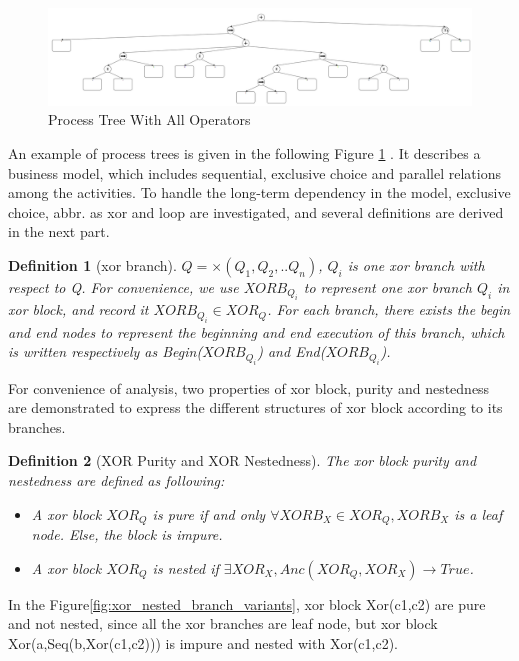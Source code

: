 \documentclass[]{article}
\newtheorem{mydef}{Definition}[section]
\begin{document}
\begin{figure}[h!]
	\includegraphics[width=\textwidth]{PT01_Not_Nested_Overview.png}
	\caption{Process Tree With All Operators}
	\label{fig:not_nested_overview}
\end{figure}
An example of process trees is given in the following Figure \ref{fig:not_nested_overview} . It describes a business model, which includes sequential, exclusive choice and parallel relations among the activities. To handle the long-term dependency in the model, exclusive choice, abbr. as xor  and loop are investigated, and several definitions are derived in the next part.
\begin{mydef}[xor branch]
   $Q= \times(Q_1 , Q_2 ,.. Q_n)$, $Q_i$ is one xor branch with respect to Q. For convenience, we use $XORB_{Q_i}$ to represent one xor branch $Q_i$ in xor block, and record it $XORB_{Q_i} \in XOR_{Q}$. For each branch, there exists the begin and end nodes to represent the beginning and end execution of this branch, which is written respectively as Begin($XORB_{Q_i}$) and End($XORB_{Q_i}$).
\end{mydef}
For convenience of analysis, two properties of xor block, purity and nestedness are demonstrated to express the different structures of xor block according to its branches.
\begin{mydef}[XOR Purity and XOR Nestedness] The xor block purity and nestedness are defined as following: \\
	\begin{itemize}
		\item A xor block $XOR_Q$ is pure if and only $\forall XORB_X \in XOR_Q, XORB_X $ is a leaf node. Else, the block is impure.
		\item A xor block $XOR_Q$ is nested if $ \exists XOR_X, Anc(XOR_Q, XOR_X) \rightarrow True  $.
	\end{itemize}
\end{mydef}
In the Figure\ref {fig:xor_nested_branch_variants}, xor block Xor(c1,c2) are pure and not nested, since all the xor branches are leaf node, but xor block Xor(a,Seq(b,Xor(c1,c2))) is impure and nested with Xor(c1,c2). 
\end{document}
